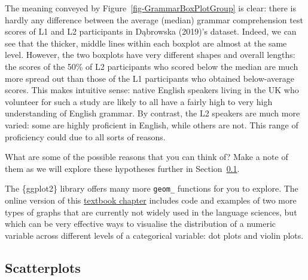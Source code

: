 \documentclass[
  letterpaper,
  DIV=11,
  numbers=noendperiod]{scrreprt}
\begin{document}
The meaning conveyed by Figure~\ref{fig-GrammarBoxPlotGroup} is clear:
there is hardly any difference between the average (median) grammar
comprehension test scores of L1 and L2 participants in Dąbrowska
(2019)'s dataset. Indeed, we can see that the thicker, middle lines
within each boxplot are almost at the same level. However, the two
boxplots have very different shapes and overall lengths: the scores of
the 50\% of L2 participants who scored below the median are much more
spread out than those of the L1 participants who obtained below-average
scores. This makes intuitive sense: native English speakers living in
the UK who volunteer for such a study are likely to all have a fairly
high to very high understanding of English grammar. By contrast, the L2
speakers are much more varied: some are highly proficient in English,
while others are not. This range of proficiency could due to all sorts
of reasons.

What are some of the possible reasons that you can think of?
 Make a note of them as we will explore these hypotheses
further in Section~\ref{sec-Scatterplots}.

\begin{tcolorbox}[enhanced jigsaw, arc=.35mm, bottomrule=.15mm, bottomtitle=1mm, breakable, colback=white, colbacktitle=quarto-callout-note-color!10!white, colframe=quarto-callout-note-color-frame, coltitle=black, left=2mm, leftrule=.75mm, opacityback=0, opacitybacktitle=0.6, rightrule=.15mm, title=\textcolor{quarto-callout-note-color}{\faInfo}\hspace{0.5em}{Going further: Dot plots and violin plots \emoji{violin}}, titlerule=0mm, toprule=.15mm, toptitle=1mm]

The \{ggplot2\} library offers many more \texttt{geom\_} functions for
you to explore. The online version of this
\href{https://elenlefoll.github.io/RstatsTextbook/10_Dataviz.html\#nte-Violins}{textbook
chapter} includes code and examples of two more types of graphs that are
currently not widely used in the language sciences, but which can be
very effective ways to visualise the distribution of a numeric variable
across different levels of a categorical variable: dot plots and violin
plots.

\end{tcolorbox}

\subsection{Scatterplots}\label{sec-Scatterplots}
\end{document}
